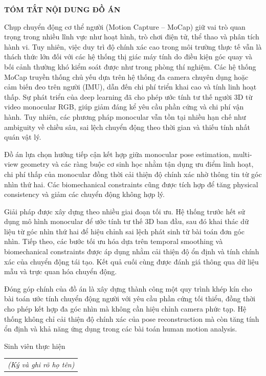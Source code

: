 \documentclass[../DoAn.tex]{subfiles}
\begin{document}
\begin{center}
    \Large{\textbf{TÓM TẮT NỘI DUNG ĐỒ ÁN}}\\
\end{center}
\vspace{1cm}

Chụp chuyển động cơ thể người (Motion Capture – MoCap) giữ vai trò quan trọng trong nhiều lĩnh vực như hoạt hình, trò chơi điện tử, thể thao và phân tích hành vi. Tuy nhiên, việc duy trì độ chính xác cao trong môi trường thực tế vẫn là thách thức lớn đối với các hệ thống thị giác máy tính do điều kiện góc quay và bối cảnh thường khó kiểm soát được như trong phòng thí nghiệm. Các hệ thống MoCap truyền thống chủ yếu dựa trên hệ thống đa camera chuyên dụng hoặc cảm biến đeo trên người (IMU), dẫn đến chi phí triển khai cao và tính linh hoạt thấp. Sự phát triển của deep learning đã cho phép ước tính tư thế người 3D từ video monocular RGB, giúp giảm đáng kể yêu cầu phần cứng và chi phí vận hành. Tuy nhiên, các phương pháp monocular vẫn tồn tại nhiều hạn chế như ambiguity về chiều sâu, sai lệch chuyển động theo thời gian và thiếu tính nhất quán vật lý.

Đồ án lựa chọn hướng tiếp cận kết hợp giữa monocular pose estimation, multi-view geometry và các ràng buộc cơ sinh học nhằm tận dụng ưu điểm linh hoạt, chi phí thấp của monocular đồng thời cải thiện độ chính xác nhờ thông tin từ góc nhìn thứ hai. Các biomechanical constraints cũng được tích hợp để tăng physical consistency và giảm các chuyển động không hợp lý.

Giải pháp được xây dựng theo nhiều giai đoạn tối ưu. Hệ thống trước hết sử dụng mô hình monocular để ước tính tư thế 3D ban đầu, sau đó khai thác dữ liệu từ góc nhìn thứ hai để hiệu chỉnh sai lệch phát sinh từ bài toán đơn góc nhìn. Tiếp theo, các bước tối ưu hóa dựa trên temporal smoothing và biomechanical constraints được áp dụng nhằm cải thiện độ ổn định và tính chính xác của chuyển động tái tạo. Kết quả cuối cùng được đánh giá thông qua dữ liệu mẫu và trực quan hóa chuyển động.

Đóng góp chính của đồ án là xây dựng thành công một quy trình khép kín cho bài toán ước tính chuyển động người với yêu cầu phần cứng tối thiểu, đồng thời cho phép kết hợp đa góc nhìn mà không cần hiệu chỉnh camera phức tạp. Hệ thống không chỉ cải thiện độ chính xác của pose reconstruction mà còn tăng tính ổn định và khả năng ứng dụng trong các bài toán human motion analysis.

\begin{flushright}
Sinh viên thực hiện\\
\begin{tabular}{@{}c@{}}
\textit{(Ký và ghi rõ họ tên)}
\end{tabular}
\end{flushright}
\end{document}
